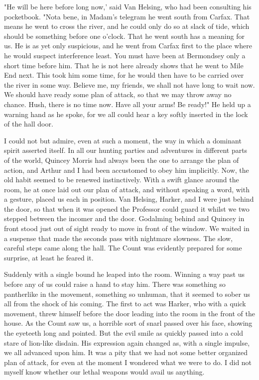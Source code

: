 "He will be here before long now,' said Van Helsing, who had been consulting his pocketbook. "Nota bene, in Madam's telegram he went south from Carfax. That means he went to cross the river, and he could only do so at slack of tide, which should be something before one o'clock. That he went south has a meaning for us. He is as yet only suspicious, and he went from Carfax first to the place where he would suspect interference least. You must have been at Bermondsey only a short time before him. That he is not here already shows that he went to Mile End next. This took him some time, for he would then have to be carried over the river in some way. Believe me, my friends, we shall not have long to wait now. We should have ready some plan of attack, so that we may throw away no chance. Hush, there is no time now. Have all your arms! Be ready!" He held up a warning hand as he spoke, for we all could hear a key softly inserted in the lock of the hall door. 

I could not but admire, even at such a moment, the way in which a dominant spirit asserted itself. In all our hunting parties and adventures in different parts of the world, Quincey Morris had always been the one to arrange the plan of action, and Arthur and I had been accustomed to obey him implicitly. Now, the old habit seemed to be renewed instinctively. With a swift glance around the room, he at once laid out our plan of attack, and without speaking a word, with a gesture, placed us each in position. Van Helsing, Harker, and I were just behind the door, so that when it was opened the Professor could guard it whilst we two stepped between the incomer and the door. Godalming behind and Quincey in front stood just out of sight ready to move in front of the window. We waited in a suspense that made the seconds pass with nightmare slowness. The slow, careful steps came along the hall. The Count was evidently prepared for some surprise, at least he feared it. 

Suddenly with a single bound he leaped into the room. Winning a way past us before any of us could raise a hand to stay him. There was something so pantherlike in the movement, something so unhuman, that it seemed to sober us all from the shock of his coming. The first to act was Harker, who with a quick movement, threw himself before the door leading into the room in the front of the house. As the Count saw us, a horrible sort of snarl passed over his face, showing the eyeteeth long and pointed. But the evil smile as quickly passed into a cold stare of lion-like disdain. His expression again changed as, with a single impulse, we all advanced upon him. It was a pity that we had not some better organized plan of attack, for even at the moment I wondered what we were to do. I did not myself know whether our lethal weapons would avail us anything. 

